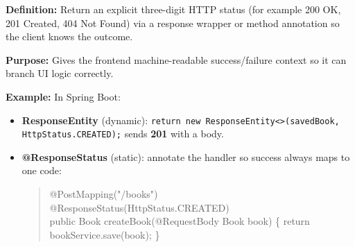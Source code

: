 \textbf{Definition:} Return an explicit three-digit HTTP status (for example 200 OK, 201 Created, 404 Not Found) via a response wrapper or method annotation so the client knows the outcome.

\textbf{Purpose:} Gives the frontend machine-readable success/failure context so it can branch UI logic correctly.

\textbf{Example:} In Spring Boot:
\begin{itemize}
  \item \textbf{ResponseEntity} (dynamic): \texttt{return new ResponseEntity<>(savedBook, HttpStatus.CREATED);} sends \textbf{201} with a body.
  \item \textbf{@ResponseStatus} (static): annotate the handler so success always maps to one code:
  \begin{quote}\small\ttfamily
@PostMapping("/books")\\
@ResponseStatus(HttpStatus.CREATED)\\
public Book createBook(@RequestBody Book book) \{ return bookService.save(book); \}
  \end{quote}
\end{itemize}

